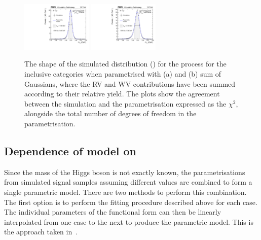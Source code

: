 \begin{figure}[ht!]
{{\includegraphics[width=0.3\textwidth]{modellingFigures/nGaus/ggh_UntaggedTag_2.pdf} 
\includegraphics[width=0.3\textwidth]{modellingFigures/nGaus/ggh_UntaggedTag_3.pdf} 
}}
\caption{The shape of the simulated \mgg distribution (\GeV) for the \ggH process for the inclusive categories when parametrised with (a) \DCBpG and (b) sum of Gaussians, where the RV and WV contributions have been summed according to their relative yield. The plots show the agreement between the simulation and the parametrisation expressed as the $\chi^2$, alongside the total number of degrees of freedom in the parametrisation.}

\label{fig:model:functionalform}
\end{figure}


\subsection{Dependence of model on \mH}

Since the mass of the Higgs boson is not exactly known, the parametrisations from simulated signal samples assuming different \mH values are combined to form a single parametric model. There are two methods to perform this combination. 
The first option is to perform the fitting procedure described above for each \mH case. The individual parameters of the functional form can then be linearly interpolated from one \mH case to the next to produce the parametric model. This is the approach taken in~\cite{LegacyHgg,CMS-PAS-HIG-15-005,CMS-PAS-HIG-16-020}.

